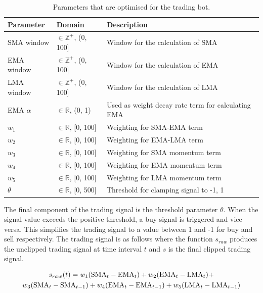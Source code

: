 \documentclass[a4paper, 12pt]{extarticle}
\begin{document}
\begin{table}[ht]
    \centering
    \label{tab:parameters}
    \begin{tabularx}{\textwidth}{X X X}
      \toprule
      \textbf{Parameter} & \textbf{Domain} & \textbf{Description} \\
      \midrule
      SMA window        & $\in \mathbb{Z}^+$, (0, 100]  & Window for the calculation of SMA \\
      EMA window        & $\in \mathbb{Z}^+$, (0, 100]  & Window for the calculation of EMA   \\
      LMA window        & $\in \mathbb{Z}^+$, (0, 100]  & Window for the calculation of LMA   \\
      EMA $\alpha$      & $\in \mathbb{R}$, (0, 1)  & Used as weight decay rate term for calculating EMA\\
      $w_1$             & $\in \mathbb{R}$, [0, 100]  & Weighting for SMA-EMA term \\
      $w_2$             & $\in \mathbb{R}$, [0, 100]  & Weighting for EMA-LMA term  \\
      $w_3$             & $\in \mathbb{R}$, [0, 100]  & Weighting for SMA momentum term \\
      $w_4$             & $\in \mathbb{R}$, [0, 100]  & Weighting for EMA momentum term\\
      $w_5$             & $\in \mathbb{R}$, [0, 100]  & Weighting for LMA momentum term \\
      $\theta$          & $\in \mathbb{R}$, [0, 500]  & Threshold for clamping signal to {-1, 1}  \\
      \bottomrule
    \end{tabularx}
    \caption{Parameters that are optimised for the trading bot.}
  \end{table}

The final component of the trading signal is the threshold parameter $\theta$. When the signal value exceeds the positive threshold, a buy signal is triggered and vice versa. This simplifies the trading signal to a value between 1 and -1 for buy and sell respectively. The trading signal is as follows where the function $s_{raw}$ produces the unclipped trading signal at time interval $t$ and $s$ is the final clipped trading signal.

\begin{multline}
    $$ s_{raw}(t) = w_1(\text{SMA}_{t} - \text{EMA}_{t}) + w_2(\text{EMA}_{t} - \text{LMA}_{t}) + \\
    w_3(\text{SMA}_t - \text{SMA}_{t - 1}) + w_4(\text{EMA}_t - \text{EMA}_{t - 1}) + w_5(\text{LMA}_t - \text{LMA}_{t - 1}) $$
\end{multline}
\end{document}
